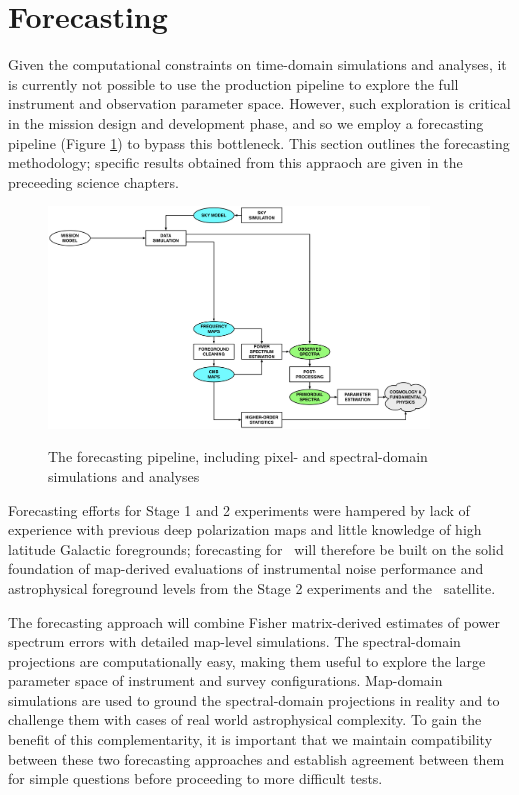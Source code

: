 
\section{Forecasting}\label{sec:Forecasting}

Given the computational constraints on time-domain simulations and analyses, it is currently not possible to use the production pipeline to explore the full instrument and observation parameter space. However, such exploration is critical in the mission design and development phase, and so we employ a forecasting pipeline (Figure \ref{fig_fcast}) to bypass this bottleneck. This section outlines the forecasting methodology; specific results obtained from this appraoch are given in the preceeding science chapters.

\begin{figure}[htbp]
\includegraphics[width=0.9\textwidth]{Analysis/forecast}\\
\caption{The forecasting pipeline, including pixel- and spectral-domain simulations and analyses}
\label{fig_fcast}
\end{figure}

Forecasting efforts for Stage 1 and 2 experiments were hampered by lack of experience with previous deep polarization maps and little knowledge of high latitude Galactic foregrounds; forecasting for \cmbexp\ will therefore be built on the solid foundation of map-derived evaluations of instrumental noise performance and astrophysical foreground levels from the Stage 2 experiments and the \planck\ satellite.

The forecasting approach will combine Fisher matrix-derived estimates of power spectrum errors with detailed map-level simulations.
The spectral-domain projections are computationally easy, making them useful to explore the large parameter space of instrument and survey configurations.
Map-domain simulations are used to ground the spectral-domain projections in reality and to challenge them with cases of real world astrophysical complexity.
To gain the benefit of this complementarity, it is important that we maintain compatibility between these two forecasting approaches and establish agreement between them for simple questions before proceeding to more difficult tests.

